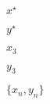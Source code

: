 \documentclass[10pt]{article}
\begin{document}
$x^{\star}$

$y^{\star}$

$x_3$

$y_3$

$\{ x_n, y_n\}$
\end{document}
